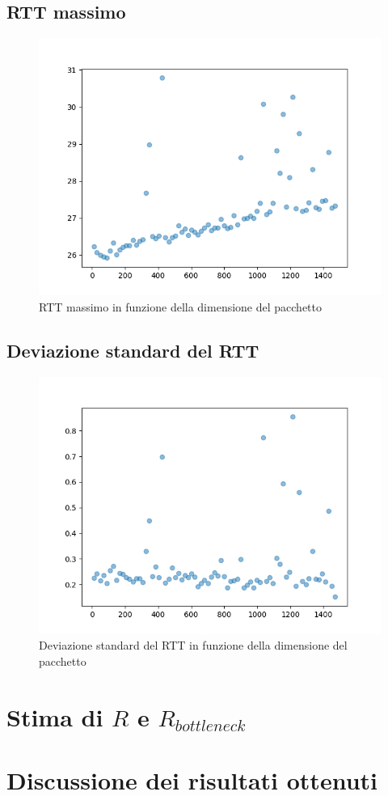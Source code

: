 \documentclass{article}
\begin{document}
\subsection{RTT massimo}

\begin{figure}[H]
  \centering
  \includegraphics[width=0.45\linewidth]{rtt_max_data.png}
  \caption{RTT massimo in funzione della dimensione del pacchetto}
  \label{fig:rtt_max_data}
\end{figure}

\subsection{Deviazione standard del RTT}

\begin{figure}[H]
  \centering
  \includegraphics[width=0.45\linewidth]{rtt_stddev_data.png}
  \caption{Deviazione standard del RTT in funzione della dimensione del pacchetto}
  \label{fig:rtt_stddev_data}
\end{figure}

\section{Stima di $R$ e $R_{bottleneck}$}

\section{Discussione dei risultati ottenuti}
\end{document}
